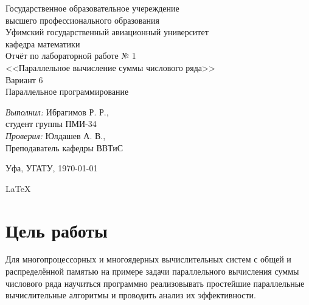 \documentclass[a4paper,12pt]{article}
\author{Ринат Ибрагимов}
\begin{document}
\begin{titlepage} %
\begin{center} %
\large Государственное образовательное учереждение\\
\large высшего профессионального образования\\
\large Уфимский государственный авиационный университет\\[1.0cm]
\large кафедра математики \\[4.5cm]

\huge Отчёт по лабораторной работе № 1\\[0.6cm] %
\large <<Параллельное вычисление суммы числового ряда>>\\[1.0cm] %
Вариант 6\\[0.5cm]
Параллельное программирование\\[4.7cm]

\begin{flushright}
\begin{minipage}{0.5\textwidth} %
\begin{flushleft} %
\emph{Выполнил:} Ибрагимов Р. Р.,\\
\quad студент группы ПМИ-34\\
\emph{Проверил:} Юлдашев А. В.,\\
\quad Преподаватель кафедры ВВТиС
\end{flushleft} %
\end{minipage} %
\end{flushright}
\vfill %
Уфа, УГАТУ, {\large \today} %

{\large \LaTeX} %
\end{center} %

\thispagestyle{empty} %
\end{titlepage} %

\tableofcontents %

\newpage

\section{Цель работы}
Для многопроцессорных и многоядерных вычислительных систем с общей и распределённой памятью на примере задачи параллельного вычисления суммы числового ряда научиться программно реализовывать простейшие параллельные вычислительные алгоритмы и проводить анализ их эффективности.
\end{document}
